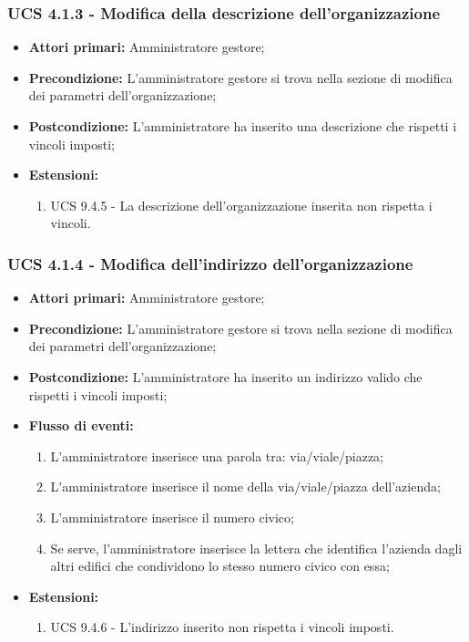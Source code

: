 \subsubsection{UCS 4.1.3 - Modifica della descrizione dell'organizzazione}%
\begin{itemize}
\item \textbf{Attori primari:} Amministratore gestore;
\item \textbf{Precondizione:} L'amministratore gestore si trova nella sezione di modifica dei parametri dell'organizzazione;
\item \textbf{Postcondizione:} L'amministratore ha inserito una descrizione che rispetti i vincoli imposti;
\item \textbf{Estensioni:}
\begin{enumerate}
    \item UCS 9.4.5 - La descrizione dell'organizzazione inserita non rispetta i vincoli.
\end{enumerate}
\end{itemize}

\subsubsection{UCS 4.1.4 - Modifica dell'indirizzo dell'organizzazione}%

\begin{itemize}
\item \textbf{Attori primari:} Amministratore gestore;
\item \textbf{Precondizione:} L'amministratore gestore si trova nella sezione di modifica dei parametri dell'organizzazione;
\item \textbf{Postcondizione:} L'amministratore ha inserito un indirizzo valido che rispetti i vincoli imposti;
\item \textbf{Flusso di eventi:}
\begin{enumerate}
    \item L'amministratore inserisce una parola tra: via/viale/piazza;
    \item L'amministratore inserisce il nome della via/viale/piazza dell'azienda;
    \item L'amministratore inserisce il numero civico;
    \item Se serve, l'amministratore inserisce la lettera che identifica l'azienda dagli altri edifici che condividono lo stesso numero civico con essa;
\end{enumerate}
\item \textbf{Estensioni:}
\begin{enumerate}
    \item UCS 9.4.6 - L'indirizzo inserito non rispetta i vincoli imposti.
\end{enumerate}
\end{itemize}

